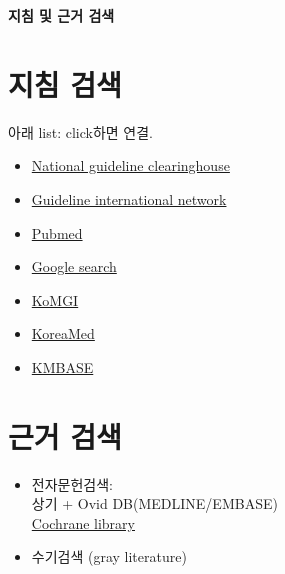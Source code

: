 \documentclass{paper}
\begin{document}
\Large \textbf{지침 및 근거 검색} \normalsize

\section{지침 검색}
아래 list: click하면 연결.
\begin{itemize}
	\item \href{http://www.guideline.gov}{National guideline clearinghouse}
	\item  \href{http://www.g-i-n.net}{Guideline international network}
	\item \href{https://www.ncbi.nlm.nih.gov/pubmed/}{Pubmed}
	\item \href{https://www.google.co.kr}{Google search}
	\item \href{http://www.guideline.or.kr}{KoMGI}
	\item \href{https://www.koreamed.org/SearchBasic.php}{KoreaMed}
	\item \href{http://kmbase.medric.or.kr}{KMBASE}
\end{itemize}

\section{근거 검색}
\begin{itemize}
	\item 전자문헌검색: \\
		상기 + Ovid DB(MEDLINE/EMBASE)\\
		\href{http://www.cochranelibrary.com}{Cochrane library}
	\item 수기검색 (gray literature)
\end{itemize}
 
\end{document}
